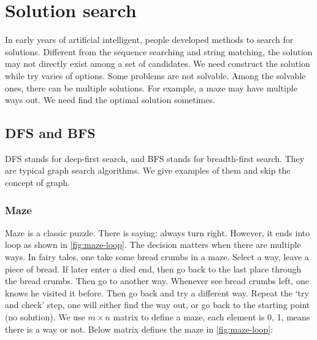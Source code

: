 \documentclass[b5paper]{article}
\begin{document}

\section{Solution search}

In early years of artificial intelligent, people developed methods to search for solutions. Different from the sequence searching and string matching, the solution may not directly exist among a set of candidates. We need construct the solution while try varies of options. Some problems are not solvable. Among the solvable ones, there can be multiple solutions. For example, a maze may have multiple ways out. We need find the optimal solution sometimes.

\subsection{DFS and BFS}
 

DFS stands for deep-first search, and BFS stands for breadth-first search. They are typical graph search algorithms. We give examples of them and skip the concept of graph.

\subsubsection{Maze}
Maze is a classic puzzle. There is saying: always turn right. However, it ends into loop as shown in \cref{fig:maze-loop}. The decision matters when there are multiple ways. In fairy tales, one take some bread crumbs in a maze. Select a way, leave a piece of bread. If later enter a died end, then go back to the last place through the bread crumbs. Then go to another way. Whenever see bread crumbs left, one knows he visited it before. Then go back and try a different way. Repeat the `try and check' step, one will either find the way out, or go back to the starting point (no solution). We use $m \times n$ matrix to define a maze, each element is 0, 1, means there is a way or not. Below matrix defines the maze in \cref{fig:maze-loop}:
\end{document}
